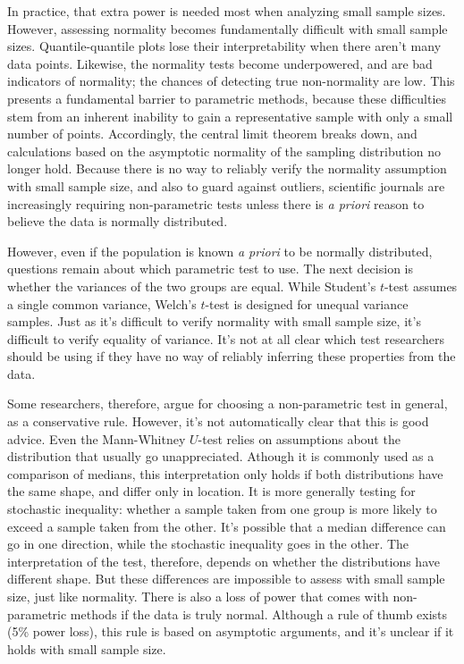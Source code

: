 \documentclass[10pt]{article} %
\begin{document}
In practice, that extra power is needed most when analyzing small sample sizes. However, assessing normality becomes fundamentally difficult with small sample sizes. Quantile-quantile plots lose their interpretability when there aren't many data points. Likewise, the normality tests become underpowered, and are bad indicators of normality; the chances of detecting true non-normality are low. This presents a fundamental barrier to parametric methods, because these difficulties stem from an inherent inability to gain a representative sample with only a small number of points. Accordingly, the central limit theorem breaks down, and calculations based on the asymptotic normality of the sampling distribution no longer hold. Because there is no way to reliably verify the normality assumption with small sample size, and also to guard against outliers, scientific journals are increasingly requiring non-parametric tests unless there is \emph{a priori} reason to believe the data is normally distributed. 

However, even if the population is known \emph{a priori} to be normally distributed, questions remain about which parametric test to use. The next decision is whether the variances of the two groups are equal. While Student's $t$-test assumes a single common variance, Welch's $t$-test is designed for unequal variance samples. Just as it's difficult to verify normality with small sample size, it's difficult to verify equality of variance. It's not at all clear which test researchers should be using if they have no way of reliably inferring these properties from the data.  

Some researchers, therefore, argue for choosing a non-parametric test in general, as a conservative rule. However, it's not automatically clear that this is good advice. Even the Mann-Whitney $U$-test relies on assumptions about the distribution that usually go unappreciated. Athough it is commonly used as a comparison of medians, this interpretation only holds if both distributions have the same shape, and differ only in location. It is more generally testing for stochastic inequality:  whether a sample taken from one group is more likely to exceed a sample taken from the other. It's possible that a median difference can go in one direction, while the stochastic inequality goes in the other. The interpretation of the test, therefore, depends on whether the distributions have different shape. But these differences are impossible to assess with small sample size, just like normality. There is also a loss of power that comes with non-parametric methods if the data is truly normal. Although a rule of thumb exists (5\% power loss), this rule is based on asymptotic arguments, and it's unclear if it holds with small sample size. 
\end{document}

